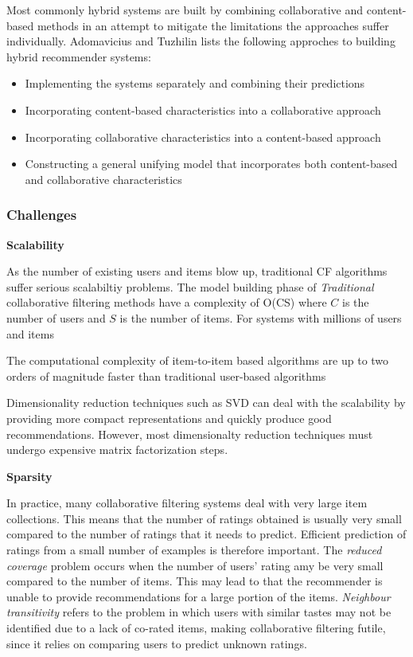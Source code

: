 Most commonly hybrid systems are built by combining collaborative and content-based methods in an attempt to mitigate the limitations the approaches suffer individually. Adomavicius and Tuzhilin \cite{Adomavicius2005} lists the following approches to building hybrid recommender systems:

\begin{itemize}
\item Implementing the systems separately and combining their predictions
\item Incorporating content-based characteristics into a collaborative approach
\item Incorporating collaborative characteristics into a content-based approach
\item Constructing a general unifying model that incorporates both content-based and collaborative characteristics
\end{itemize}

\subsubsection{Challenges}

\textbf{Scalability}

As the number of existing users and items blow up, traditional CF algorithms suffer serious scalabiltiy problems. The model building phase of \emph{Traditional} collaborative filtering methods have a complexity of O(CS) where $C$ is the number of users and $S$ is the number of items. For systems with millions of users and items

The computational complexity of item-to-item based algorithms are up to two orders of magnitude faster than traditional user-based algorithms \cite{Deshpande2004}

Dimensionality reduction techniques such as SVD can deal with the scalability by providing more compact representations and quickly produce good recommendations. However, most dimensionalty reduction techniques must undergo expensive matrix factorization steps.

\textbf{Sparsity}

In practice, many collaborative filtering systems deal with very large item collections. This means that the number of ratings obtained is usually very small compared to the number of ratings that it needs to predict. Efficient prediction of ratings from a small number of examples is therefore important. The \emph{reduced coverage} problem occurs when the number of users' rating amy be very small compared to the number of items. This may lead to that the recommender is unable to provide recommendations for a large portion of the items. \emph{Neighbour transitivity} refers to the problem in which users with similar tastes may not be identified due to a lack of co-rated items, making collaborative filtering futile, since it relies on comparing users to predict unknown ratings.

